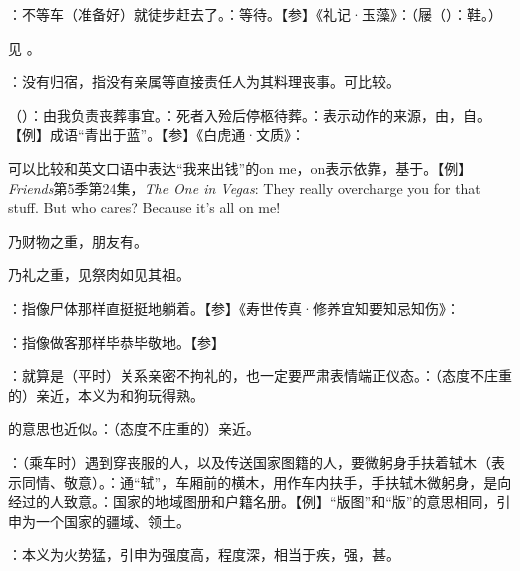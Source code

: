 {
\item {}：不等车（准备好）就徒步赶去了。：等待。【参】《礼记·玉藻》：（屦（）：鞋。）
}
{}


{见 。}
{}


{
\item {}：没有归宿，指没有亲属等直接责任人为其料理丧事。可比较。
\item {}（）：由我负责丧葬事宜。：死者入殓后停柩待葬。：表示动作的来源，由，自。【例】成语“青出于蓝”。【参】《白虎通·文质》：

可以比较和英文口语中表达“我来出钱”的on me，on表示依靠，基于。【例】\emph{Friends}第5季第24集，\emph{The One in Vegas}: They really overcharge you for that stuff. But who cares? Because it's all on me!
}
{}


{
\item {}乃财物之重，朋友有。

乃礼之重，见祭肉如见其祖。
}
{}


{
\item {}：指像尸体那样直挺挺地躺着。【参】《寿世传真·修养宜知要知忌知伤》：%
\item {}：指像做客那样毕恭毕敬地。【参】
}
{}


{
\item {}：就算是（平时）关系亲密不拘礼的，也一定要严肃表情端正仪态。：（态度不庄重的）亲近，本义为和狗玩得熟。

的意思也近似。：（态度不庄重的）亲近。
\item {}：（乘车时）遇到穿丧服的人，以及传送国家图籍的人，要微躬身手扶着轼木（表示同情、敬意）。：通“轼”，车厢前的横木，用作车内扶手，手扶轼木微躬身，是向经过的人致意。：国家的地域图册和户籍名册。【例】“版图”和“版”的意思相同，引申为一个国家的疆域、领土。
\item {}：本义为火势猛，引申为强度高，程度深，相当于疾，强，甚。
}
{}


